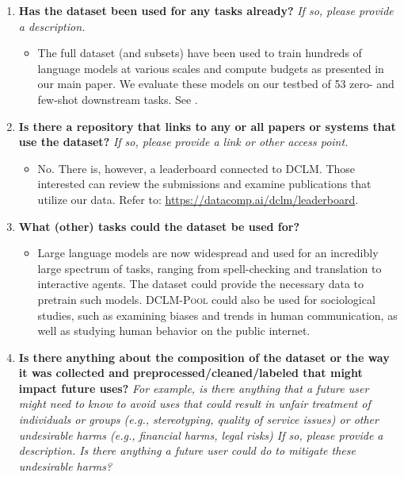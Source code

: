 \documentclass{article}
\newcommand{\dclm}{\textsc{DCLM}\xspace}
\newcommand{\rawpool}{\textsc{DCLM-Pool}\xspace}
\newcommand{\leaderboard}{\url{https://datacomp.ai/dclm/leaderboard}\xspace}%
\begin{document}
\begin{enumerate}[label=Q\arabic*, resume]

\item \textbf{Has the dataset been used for any tasks already?} \textit{If so, please provide a description.}

\begin{itemize}
\item The full dataset (and subsets) have been used to train hundreds of language models at various scales and compute budgets as presented in our main paper. We evaluate these models on our testbed of 53 zero- and few-shot downstream tasks. See .
\end{itemize}

\item \textbf{Is there a repository that links to any or all papers or systems that use the dataset?} \textit{If so, please provide a link or other access point.}

\begin{itemize}
\item No. There is, however, a leaderboard connected to \dclm. Those interested can review the submissions and examine publications that utilize our data. Refer to: \leaderboard.
\end{itemize}

\item \textbf{What (other) tasks could the dataset be used for?}

\begin{itemize}
\item Large language models are now widespread and used for an incredibly large spectrum of tasks, ranging from spell-checking and translation to interactive agents. The dataset could provide the necessary data to pretrain such models. \rawpool could also be used for sociological studies, such as examining biases and trends in human communication, as well as studying human behavior on the public internet.
\end{itemize}

\item \textbf{Is there anything about the composition of the dataset or the way it was collected and preprocessed/cleaned/labeled that might impact future uses?} \textit{For example, is there anything that a future user might need to know to avoid uses that could result in unfair treatment of individuals or groups (e.g., stereotyping, quality of service issues) or other undesirable harms (e.g., financial harms, legal risks) If so, please provide a description. Is there anything a future user could do to mitigate these undesirable harms?}



\end{enumerate}
\end{document}
